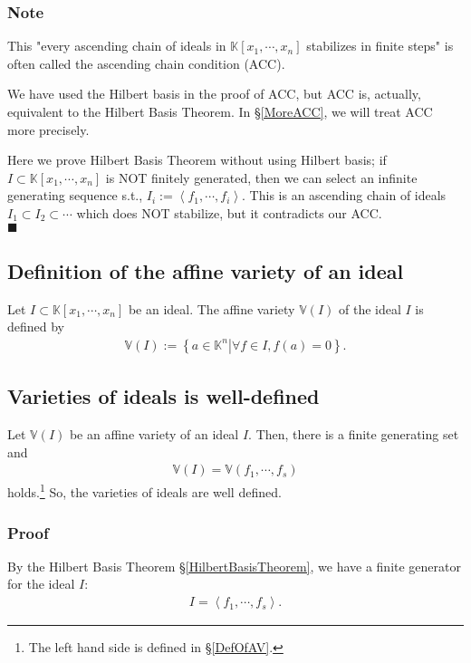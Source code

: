 \documentclass[11pt]{book}
\begin{document}
\subsubsection{Note}
This "every ascending chain of ideals in $\mathbb{K}[x_1, \cdots, x_{n}]$ stabilizes in finite steps" is often called the ascending chain condition (ACC).

We have used the Hilbert basis in the proof of ACC, but ACC is, actually, equivalent to the Hilbert Basis Theorem.
In \S\ref{MoreACC}, we will treat ACC more precisely.

Here we prove Hilbert Basis Theorem without using Hilbert basis; if $I \subset \mathbb{K}[x_1, \cdots, x_{n}]$ is NOT finitely generated, then we can select an infinite generating sequence s.t., $I_i := \left<f_1, \cdots, f_i \right>$.
This is an ascending chain of ideals $I_1 \subset I_2 \subset \cdots$ which does NOT stabilize, but it contradicts our ACC.\\
$\blacksquare$


\subsection{Definition of the affine variety of an ideal}
Let $I \subset \mathbb{K}[x_1, \cdots, x_n]$ be an ideal.
The affine variety $\mathbb{V}(I)$ of the ideal $I$ is defined by
\begin{eqnarray}
\mathbb{V}(I) := \left\{ \left. a \in \mathbb{K}^n \right| \forall f \in I, f(a) = 0\right\}.
\end{eqnarray}

\subsection{Varieties of ideals is well-defined}
Let $\mathbb{V}(I)$ be an affine variety of an ideal $I$.
Then, there is a finite generating set and
\begin{eqnarray}
\mathbb{V}(I) = \mathbb{V}(f_1, \cdots, f_s)
\end{eqnarray}
holds.\footnote{The left hand side is defined in \S\ref{DefOfAV}.}
So, the varieties of ideals are well defined.

\subsubsection{Proof}
By the Hilbert Basis Theorem \S\ref{HilbertBasisTheorem}, we have a finite generator for the ideal $I$:
\begin{eqnarray}
I = \left< f_1, \cdots, f_s \right>.
\end{eqnarray}
\end{document}
